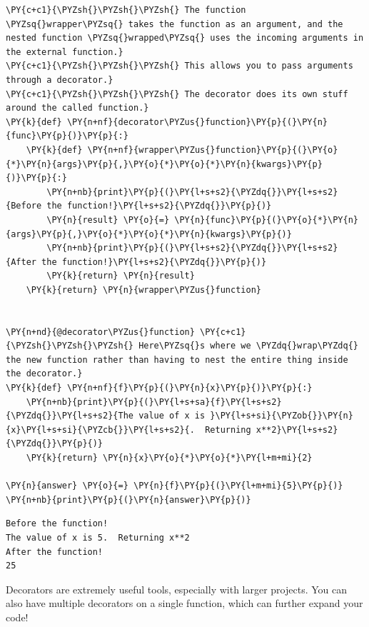     \begin{tcolorbox}[breakable, size=fbox, boxrule=1pt, pad at break*=1mm,colback=cellbackground, colframe=cellborder]
\begin{Verbatim}[commandchars=\\\{\}]
\PY{c+c1}{\PYZsh{}\PYZsh{}\PYZsh{} The function \PYZsq{}wrapper\PYZsq{} takes the function as an argument, and the nested function \PYZsq{}wrapped\PYZsq{} uses the incoming arguments in the external function.}
\PY{c+c1}{\PYZsh{}\PYZsh{}\PYZsh{} This allows you to pass arguments through a decorator.}
\PY{c+c1}{\PYZsh{}\PYZsh{}\PYZsh{} The decorator does its own stuff around the called function.}
\PY{k}{def} \PY{n+nf}{decorator\PYZus{}function}\PY{p}{(}\PY{n}{func}\PY{p}{)}\PY{p}{:}
    \PY{k}{def} \PY{n+nf}{wrapper\PYZus{}function}\PY{p}{(}\PY{o}{*}\PY{n}{args}\PY{p}{,}\PY{o}{*}\PY{o}{*}\PY{n}{kwargs}\PY{p}{)}\PY{p}{:}
        \PY{n+nb}{print}\PY{p}{(}\PY{l+s+s2}{\PYZdq{}}\PY{l+s+s2}{Before the function!}\PY{l+s+s2}{\PYZdq{}}\PY{p}{)}
        \PY{n}{result} \PY{o}{=} \PY{n}{func}\PY{p}{(}\PY{o}{*}\PY{n}{args}\PY{p}{,}\PY{o}{*}\PY{o}{*}\PY{n}{kwargs}\PY{p}{)}
        \PY{n+nb}{print}\PY{p}{(}\PY{l+s+s2}{\PYZdq{}}\PY{l+s+s2}{After the function!}\PY{l+s+s2}{\PYZdq{}}\PY{p}{)}
        \PY{k}{return} \PY{n}{result}
    \PY{k}{return} \PY{n}{wrapper\PYZus{}function}


\PY{n+nd}{@decorator\PYZus{}function} \PY{c+c1}{\PYZsh{}\PYZsh{}\PYZsh{} Here\PYZsq{}s where we \PYZdq{}wrap\PYZdq{} the new function rather than having to nest the entire thing inside the decorator.}
\PY{k}{def} \PY{n+nf}{f}\PY{p}{(}\PY{n}{x}\PY{p}{)}\PY{p}{:}
    \PY{n+nb}{print}\PY{p}{(}\PY{l+s+sa}{f}\PY{l+s+s2}{\PYZdq{}}\PY{l+s+s2}{The value of x is }\PY{l+s+si}{\PYZob{}}\PY{n}{x}\PY{l+s+si}{\PYZcb{}}\PY{l+s+s2}{.  Returning x**2}\PY{l+s+s2}{\PYZdq{}}\PY{p}{)}
    \PY{k}{return} \PY{n}{x}\PY{o}{*}\PY{o}{*}\PY{l+m+mi}{2}

\PY{n}{answer} \PY{o}{=} \PY{n}{f}\PY{p}{(}\PY{l+m+mi}{5}\PY{p}{)}
\PY{n+nb}{print}\PY{p}{(}\PY{n}{answer}\PY{p}{)}
\end{Verbatim}
\end{tcolorbox}

    \begin{Verbatim}[commandchars=\\\{\}]
Before the function!
The value of x is 5.  Returning x**2
After the function!
25
    \end{Verbatim}

    Decorators are extremely useful tools, especially with larger projects.
You can also have multiple decorators on a single function, which can
further expand your code!

